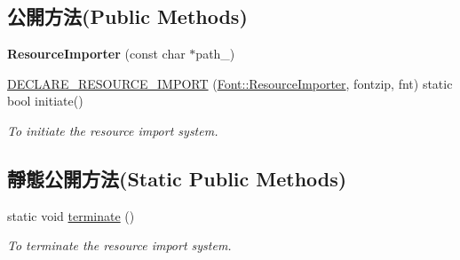 \subsection*{公開方法(Public Methods)}
\begin{DoxyCompactItemize}
\item 
{\bfseries Resource\+Importer} (const char $\ast$path\+\_\+)\hypertarget{class_magnum_1_1_font_1_1_resource_importer_a579827ce1e567014df088fe48ebe98b3}{}\label{class_magnum_1_1_font_1_1_resource_importer_a579827ce1e567014df088fe48ebe98b3}

\item 
\hyperlink{class_magnum_1_1_font_1_1_resource_importer_aa4051cd06e3e8c1148a4bffbabeed67f}{D\+E\+C\+L\+A\+R\+E\+\_\+\+R\+E\+S\+O\+U\+R\+C\+E\+\_\+\+I\+M\+P\+O\+RT} (\hyperlink{class_magnum_1_1_font_1_1_resource_importer}{Font\+::\+Resource\+Importer}, fontzip, fnt) static bool initiate()\hypertarget{class_magnum_1_1_font_1_1_resource_importer_aa4051cd06e3e8c1148a4bffbabeed67f}{}\label{class_magnum_1_1_font_1_1_resource_importer_aa4051cd06e3e8c1148a4bffbabeed67f}

\begin{DoxyCompactList}\small\item\em To initiate the resource import system. \end{DoxyCompactList}\end{DoxyCompactItemize}
\subsection*{靜態公開方法(Static Public Methods)}
\begin{DoxyCompactItemize}
\item 
static void \hyperlink{class_magnum_1_1_font_1_1_resource_importer_ae6a44b5fa44b7c4ac523f87c91224e32}{terminate} ()\hypertarget{class_magnum_1_1_font_1_1_resource_importer_ae6a44b5fa44b7c4ac523f87c91224e32}{}\label{class_magnum_1_1_font_1_1_resource_importer_ae6a44b5fa44b7c4ac523f87c91224e32}

\begin{DoxyCompactList}\small\item\em To terminate the resource import system. \end{DoxyCompactList}\end{DoxyCompactItemize}
